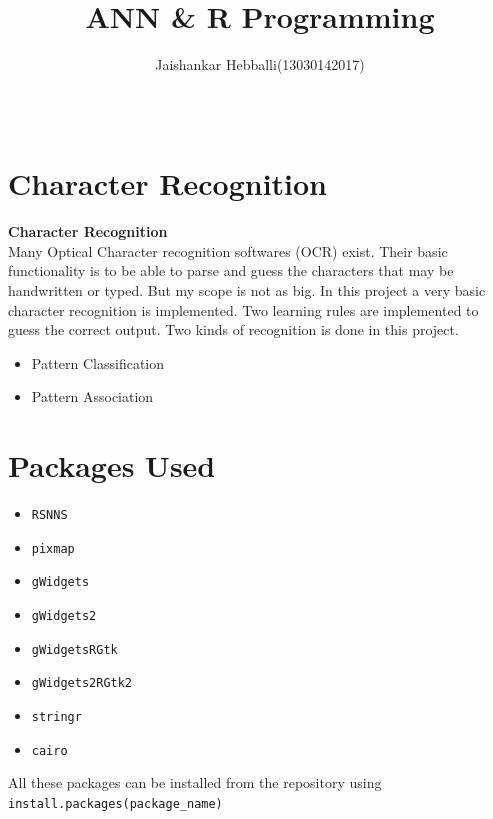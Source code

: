 \documentclass[xcolor=table]{beamer}
\title{ANN \& R Programming}
\date {~}
\author{Jaishankar Hebballi(13030142017)}
\begin{document}
\maketitle{}
\section{Character Recognition}
\begin{frame}
\textbf {Character Recognition} \\
Many Optical Character recognition softwares (OCR) exist. 
Their basic functionality is to be able to parse and guess the characters that may be handwritten or typed.
But my scope is not as big. In this project a very basic character recognition is implemented. Two learning rules are implemented
to guess the correct output. Two kinds of recognition is done in this project.
\begin{itemize} [<+->]
\item Pattern Classification	
\item Pattern Association
\end{itemize}

\end{frame}

\section{Packages Used}
\begin{frame}[fragile]

\begin{itemize} [<+->]
\item \verb+RSNNS+
\item \verb+pixmap+
\item \verb+gWidgets+
\item \verb+gWidgets2+
\item \verb+gWidgetsRGtk+ 
\item \verb+gWidgets2RGtk2+
\item \verb+stringr+
\item \verb+cairo+
\end{itemize}
All these packages can be installed from the repository using \verb+install.packages(package_name)+
\end{frame}
\end{document}
